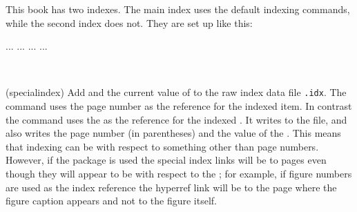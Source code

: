     This book has two indexes. 
The main index uses the default indexing
commands, while the second index does not. They are set up like this:
\begin{lcode}
\makeindex
\makeindex[lines]
... ... ...
...
\clearpage
\pagestyle{Index}
\renewcommand{\preindexhook}{%
The first page number is usually, but not always,
the primary reference to the indexed topic.\vskip\onelineskip}
\printindex

\clearpage
\pagestyle{ruled}
\renewcommand{\preindexhook}{}
\renewcommand{\indexname}{Index of first lines}
\onecolindex
\printindex[lines]
\end{lcode}


\begin{syntax}
\cmd{\specialindex} \\
\end{syntax}
\glossary(specialindex)%
  {}%
  {Add  and the current value of 
   to the raw index data file \texttt{.idx}.}
The \cmd{\index} command uses the page number 
as the reference for 
the indexed item. In contrast the \cmd{\specialindex} command uses
the  as the reference 
for the indexed .
It writes  to the  file, and also writes
the page number (in parentheses) and the value of the .
This means that indexing can be with respect to something other than page 
numbers. However, if the  package is used the special
index links will be to pages even though they will appear to be with 
respect to the ; for example, if figure numbers are used
as the index reference the hyperref link will be to the page where the
figure caption appears and not to the figure itself.


